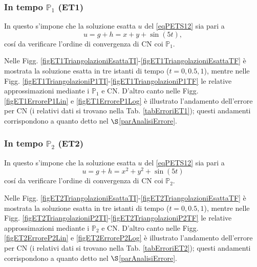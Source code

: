 \documentclass{article}
\newcommand{\SpaziaturaMate}[3]{
    \setlength{\thinmuskip}{#1mu}
    \setlength{\medmuskip}{#2mu}
    \setlength{\thickmuskip}{#3mu}
}
\begin{document}
                

            \subsubsection{In tempo \texorpdfstring{$\mathbb P_1$}{P1} (ET1)}
            
                In questo s'impone che la soluzione esatta $u$ del \eqref{eqPETS12} sia pari a
                \begin{equation*}
                    u=g+h=x+y+\sin(5t),
                    \label{eqSoluzioneEsattaET1}
                \end{equation*}
                cosí da verificare l'ordine di convergenza di CN coi $\mathbb P_1$.

                {\SpaziaturaMate{1}{2}{3}
                Nelle Figg. \ref{figET1TriangolazioniEsattaTI}-\ref{figET1TriangolazioniEsattaTF} è mostrata la soluzione esatta in tre istanti di tempo ($t=0,0.5,1$), mentre nelle Figg. \ref{figET1TriangolazioniP1TI}-\ref{figET1TriangolazioniP1TF} le relative approssimazioni mediante i $\mathbb P_1$ e CN. D'altro canto nelle Figg. \ref{figET1ErroreP1Lin} e \ref{figET1ErroreP1Log} è illustrato l'andamento dell'errore per CN (i relativi dati si trovano nella Tab. \ref{tabErroriET1}); questi andamenti corrispondono a quanto detto nel $\S$\ref{parAnalisiErrore}.}
                
            
            \subsubsection{In tempo \texorpdfstring{$\mathbb P_2$}{P2} (ET2)}

                In questo s'impone che la soluzione esatta $u$ del \eqref{eqPETS12} sia pari a
                \begin{equation*}
                    u=g+h=x^2+y^2+\sin(5t)
                    \label{eqSoluzioneEsattaET2}
                \end{equation*}
                cosí da verificare l'ordine di convergenza di CN coi $\mathbb P_2$.

                {\SpaziaturaMate{1}{2}{3}
                Nelle Figg. \ref{figET2TriangolazioniEsattaTI}-\ref{figET2TriangolazioniEsattaTF} è mostrata la soluzione esatta in tre istanti di tempo ($t=0,0.5,1$), mentre nelle Figg. \ref{figET2TriangolazioniP2TI}-\ref{figET2TriangolazioniP2TF} le relative approssimazioni mediante i $\mathbb P_2$ e CN. D'altro canto nelle Figg. \ref{figET2ErroreP2Lin} e \ref{figET2ErroreP2Log} è illustrato l'andamento dell'errore per CN (i relativi dati si trovano nella Tab. \ref{tabErroriET2}); questi andamenti corrispondono a quanto detto nel $\S$\ref{parAnalisiErrore}.}
\end{document}
